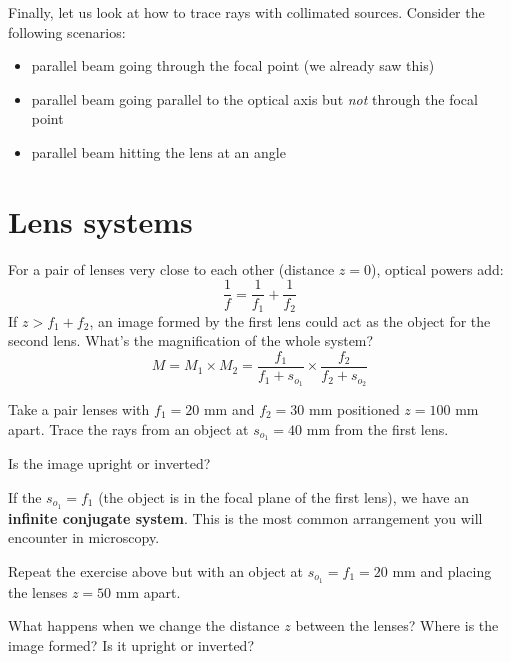 \documentclass[a4paper]{report}
\newcommand{\nexercise}[0]{\arabic{exercises}\addtocounter{exercises}{1}}
\begin{document}
\begin{exercisebox}[frametitle={Exercise \nexercise: Ray tracing with collimated sources}]
Finally, let us look at how to trace rays with collimated sources. Consider the following scenarios:
\begin{itemize}
	\item parallel beam going through the focal point (we already saw this)
	\item parallel beam going parallel to the optical axis but \textit{not} through the focal point
	\item parallel beam hitting the lens at an angle
\end{itemize}
\end{exercisebox}

\section{Lens systems}
For a pair of lenses very close to each other (distance $z=0$), optical powers add:
\begin{equation}
	\frac{1}{f} = \frac{1}{f_1} + \frac{1}{f_2}
\end{equation}
If $z>f_1+f_2$, an image formed by the first lens could act as the object for the second lens. What's the magnification of the whole system?
\begin{equation}
	M = M_1 \times M_2 = 
	\frac{f_1}{f_1 + s_{o_1}} \times 
	\frac{f_2}{f_2 + s_{o_2}}
\end{equation}

\begin{exercisebox}[frametitle={Exercise \nexercise: Pair of lenses}]
Take a pair lenses with $f_1=20$ mm and $f_2=30$ mm positioned $z=100$ mm apart. Trace the rays from an object at $s_{o_1}=40$ mm from the first lens.

Is the image upright or inverted?
\end{exercisebox}

If the $s_{o_1} = f_1$ (the object is in the focal plane of the first lens), we have an \textbf{infinite conjugate system}. This is the most common arrangement you will encounter in microscopy.

\begin{exercisebox}[frametitle={Exercise \nexercise: Infinite conjugate}]
Repeat the exercise above but with an object at $s_{o_1}=f_1=20$ mm and placing the lenses $z=50$ mm apart.

What happens when we change the distance $z$ between the lenses? Where is the image formed? Is it upright or inverted?
\end{exercisebox}
\end{document}
